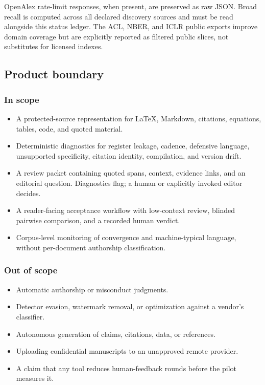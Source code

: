 \documentclass[11pt]{article}
\providecommand{\tightlist}{\setlength{\itemsep}{0pt}\setlength{\parskip}{0pt}}
\begin{document}
OpenAlex rate-limit responses, when present, are preserved as raw JSON. Broad recall is computed across all declared discovery sources and must be read alongside this status ledger. The ACL, NBER, and ICLR public exports improve domain coverage but are explicitly reported as filtered public slices, not substitutes for licensed indexes.

\hypertarget{product-boundary}{%
\subsection{Product boundary}\label{product-boundary}}

\hypertarget{in-scope}{%
\subsubsection{In scope}\label{in-scope}}

\begin{itemize}
\tightlist
\item
  A protected-source representation for LaTeX, Markdown, citations, equations, tables, code, and quoted material.
\item
  Deterministic diagnostics for register leakage, cadence, defensive language, unsupported specificity, citation identity, compilation, and version drift.
\item
  A review packet containing quoted spans, context, evidence links, and an editorial question. Diagnostics flag; a human or explicitly invoked editor decides.
\item
  A reader-facing acceptance workflow with low-context review, blinded pairwise comparison, and a recorded human verdict.
\item
  Corpus-level monitoring of convergence and machine-typical language, without per-document authorship classification.
\end{itemize}

\hypertarget{out-of-scope}{%
\subsubsection{Out of scope}\label{out-of-scope}}

\begin{itemize}
\tightlist
\item
  Automatic authorship or misconduct judgments.
\item
  Detector evasion, watermark removal, or optimization against a vendor's classifier.
\item
  Autonomous generation of claims, citations, data, or references.
\item
  Uploading confidential manuscripts to an unapproved remote provider.
\item
  A claim that any tool reduces human-feedback rounds before the pilot measures it.
\end{itemize}
\end{document}
